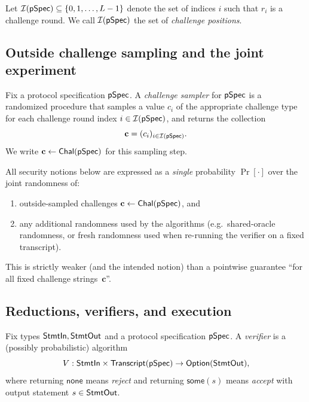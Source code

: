 \begin{definition}
Let $\mathcal{I}(\mathsf{pSpec}) \subseteq \{0,1,\dots,L-1\}$ denote the set of indices $i$ such that $r_i$ is
a challenge round. We call $\mathcal{I}(\mathsf{pSpec})$ the set of \emph{challenge positions}.
\end{definition}

\subsection{Outside challenge sampling and the joint experiment}

\begin{definition}
Fix a protocol specification $\mathsf{pSpec}$.  A \emph{challenge sampler} for $\mathsf{pSpec}$ is a randomized
procedure that samples a value $c_i$ of the appropriate challenge type for each challenge round
index $i \in \mathcal{I}(\mathsf{pSpec})$, and returns the collection
\[
  \mathbf{c} = (c_i)_{i \in \mathcal{I}(\mathsf{pSpec})}.
\]
We write $\mathbf{c} \gets \mathsf{Chal}(\mathsf{pSpec})$ for this sampling step.
\end{definition}

\begin{remark}
All security notions below are expressed as a \emph{single} probability $\Pr[\cdot]$ over the joint
randomness of:
\begin{enumerate}
  \item outside-sampled challenges $\mathbf{c} \gets \mathsf{Chal}(\mathsf{pSpec})$, and
  \item any additional randomness used by the algorithms (e.g.\ shared-oracle randomness, or fresh
  randomness used when re-running the verifier on a fixed transcript).
\end{enumerate}
This is strictly weaker (and the intended notion) than a pointwise guarantee ``for all fixed
challenge strings~$\mathbf{c}$''.
\end{remark}

\subsection{Reductions, verifiers, and execution}

\begin{definition}
Fix types $\mathsf{StmtIn},\mathsf{StmtOut}$ and a protocol specification $\mathsf{pSpec}$. A \emph{verifier} is a (possibly
probabilistic) algorithm
\[
  V : \mathsf{StmtIn} \times \mathsf{Transcript}(\mathsf{pSpec}) \to \mathsf{Option}(\mathsf{StmtOut}),
\]
where returning $\mathsf{none}$ means \emph{reject} and returning $\mathsf{some}(s)$ means
\emph{accept} with output statement $s \in \mathsf{StmtOut}$.
\end{definition}


